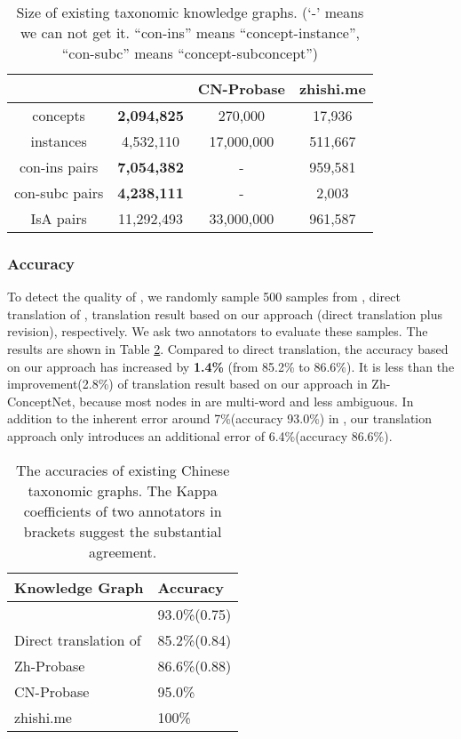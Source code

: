 \begin{table}[ht]
	\small
	\centering
	\begin{tabular}{|c|c|c|c|}
		\hline
		\textbf{}&\textbf{\zhpro}&\textbf{CN-Probase}&\textbf{zhishi.me}\\ \hline\hline
		concepts  &\textbf{2,094,825}&270,000&17,936\\
		instances  &4,532,110&17,000,000&511,667\\
		con-ins pairs &\textbf{7,054,382}&-&959,581\\
		con-subc pairs&\textbf{4,238,111}&-&2,003\\
		IsA pairs&11,292,493&33,000,000&961,587 \\ \hline
		\end{tabular}
		\caption{Size of existing taxonomic knowledge graphs. (`-' means we can not get it. ``con-ins'' means ``concept-instance'', ``con-subc'' means ``concept-subconcept'')}
		\label{tab:probase_coverage}
\end{table}

\subsubsection*{Accuracy}	
To detect the quality of \zhpro, 
we randomly sample 500 samples from \pro, direct translation of \pro, translation result based on our approach (direct translation plus revision), respectively.
We ask two annotators to evaluate these samples. 
The results are shown in Table \ref{tab:probase_accuracy}. 
Compared to direct translation, the accuracy based on our approach has increased by \textbf{1.4\%} (from 85.2\% to 86.6\%).
It is less than the improvement(2.8\%) of translation result based on our approach in
Zh-ConceptNet, because most nodes in \pro are multi-word and less ambiguous.
In addition to the inherent error around 7\%(accuracy 93.0\%) in \pro, our translation approach only introduces an additional error of 6.4\%(accuracy 86.6\%).

\begin{table}[ht]
\small
\centering
	\begin{tabular}{|l|l|}
		\hline
		\textbf{Knowledge Graph} & \textbf{Accuracy} \\ \hline\hline
		\pro    & 93.0\%(0.75) \\ \hline
		Direct translation of \pro    & 85.2\%(0.84) \\ \hline
		Zh-Probase & 86.6\%(0.88) \\ \hline
		CN-Probase     & 95.0\% \\ \hline
		zhishi.me     & 100\% \\ \hline
	\end{tabular}
	\caption{The accuracies of existing Chinese taxonomic graphs. The Kappa coefficients of two annotators in brackets suggest the substantial agreement.  }
	\label{tab:probase_accuracy}
\end{table}

